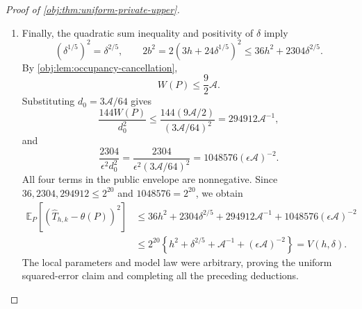 \begin{proof}[Proof of \cref{obj:thm:uniform-private-upper}]
\begin{enumerate}
\item
Finally, the quadratic sum inequality and positivity of \(\delta\) imply
\[
(\delta^{1/5})^2=\delta^{2/5},
\qquad
2b^2
=2(3h+24\delta^{1/5})^2
\le36h^2+2304\delta^{2/5}.
\]
By \cref{obj:lem:occupancy-cancellation},
\[
W(P)\le\frac92\mathcal A.
\]
Substituting \(d_0=3\mathcal A/64\) gives
\[
\frac{144W(P)}{d_0^2}
\le
\frac{144(9\mathcal A/2)}{(3\mathcal A/64)^2}
=294912\mathcal A^{-1},
\]
and
\[
\frac{2304}{\epsilon^2d_0^2}
=
\frac{2304}{\epsilon^2(3\mathcal A/64)^2}
=1048576(\epsilon\mathcal A)^{-2}.
\]
All four terms in the public envelope are nonnegative. Since
\(36,2304,294912\le2^{20}\) and \(1048576=2^{20}\), we obtain
\[
\begin{aligned}
\mathbb E_P[(\widehat T_{h,k}-\theta(P))^2]
&\le
36h^2+2304\delta^{2/5}
+294912\mathcal A^{-1}
+1048576(\epsilon\mathcal A)^{-2}\\
&\le
2^{20}\left\{
h^2+\delta^{2/5}+\mathcal A^{-1}
+(\epsilon\mathcal A)^{-2}
\right\}
=V(h,\delta).
\end{aligned}
\]
The local parameters and model law were arbitrary, proving the uniform squared-error claim and completing all the preceding deductions.
\end{enumerate}
\end{proof}

